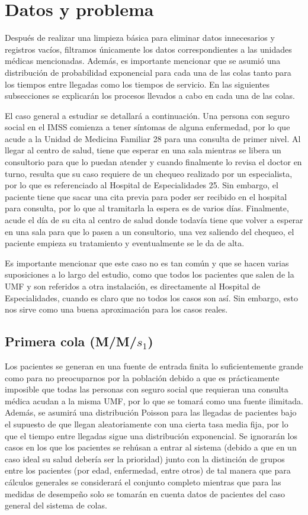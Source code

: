 \documentclass[10pt]{article}
\begin{document}
    \section{Datos y problema}
    Después de realizar una limpieza básica para eliminar datos innecesarios y registros vacíos, filtramos únicamente los datos correspondientes a las unidades médicas mencionadas. Además, es importante mencionar que se asumió una distribución de probabilidad exponencial para cada una de las colas tanto para los tiempos entre llegadas como los tiempos de servicio. En las siguientes subsecciones se explicarán los procesos llevados a cabo en cada una de las colas.
    
    El caso general a estudiar se detallará a continuación. Una persona con seguro social en el IMSS comienza a tener síntomas de alguna enfermedad, por lo que acude a la Unidad de Medicina Familiar 28 para una consulta de primer nivel. Al llegar al centro de salud, tiene que esperar en una sala mientras se libera un consultorio para que lo puedan atender y cuando finalmente lo revisa el doctor en turno, resulta que su caso requiere de un chequeo realizado por un especialista, por lo que es referenciado al Hospital de Especialidades 25. Sin embargo, el paciente tiene que sacar una cita previa para poder ser recibido en el hospital para consulta, por lo que al tramitarla la espera es de varios días. Finalmente, acude el día de su cita al centro de salud donde todavía tiene que volver a esperar en una sala para que lo pasen a un consultorio, una vez saliendo del chequeo, el paciente empieza su tratamiento y eventualmente se le da de alta.
    
    Es importante mencionar que este caso no es tan común y que se hacen varias suposiciones a lo largo del estudio, como que todos los pacientes que salen de la UMF y son referidos a otra instalación, es directamente al Hospital de Especialidades, cuando es claro que no todos los casos son así. Sin embargo, esto nos sirve como una buena aproximación para los casos reales.
    
    \subsection{Primera cola (M/M/$s_{1}$)}
    Los pacientes se generan en una fuente de entrada finita lo suficientemente grande como para no preocuparnos por la población debido a que es prácticamente imposible que todas las personas con seguro social que requieran una consulta médica acudan a la misma UMF, por lo que se tomará como una fuente ilimitada. Además, se asumirá una distribución Poisson para las llegadas de pacientes bajo el supuesto de que llegan aleatoriamente con una cierta tasa media fija, por lo que el tiempo entre llegadas sigue una distribución exponencial. Se ignorarán los casos en los que los pacientes se rehúsan a entrar al sistema (debido a que en un caso ideal su salud debería ser la prioridad) junto con la distinción de grupos entre los pacientes (por edad, enfermedad, entre otros) de tal manera que para cálculos generales se considerará el conjunto completo mientras que para las medidas de desempeño solo se tomarán en cuenta datos de pacientes del caso general del sistema de colas.
    
\end{document}
